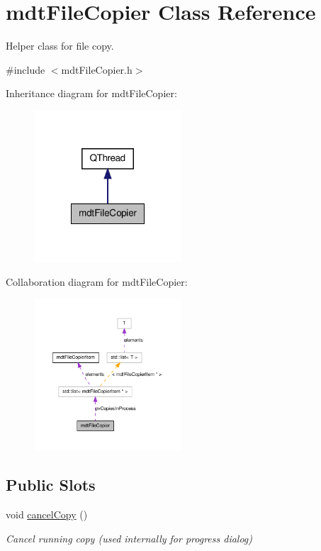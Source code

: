 \hypertarget{classmdt_file_copier}{\section{mdt\-File\-Copier Class Reference}
\label{classmdt_file_copier}
}


Helper class for file copy.  




{\ttfamily \#include $<$mdt\-File\-Copier.\-h$>$}



Inheritance diagram for mdt\-File\-Copier\-:\nopagebreak
\begin{figure}[H]
\begin{center}
\leavevmode
\includegraphics[width=156pt]{classmdt_file_copier__inherit__graph}
\end{center}
\end{figure}


Collaboration diagram for mdt\-File\-Copier\-:\nopagebreak
\begin{figure}[H]
\begin{center}
\leavevmode
\includegraphics[width=156pt]{classmdt_file_copier__coll__graph}
\end{center}
\end{figure}
\subsection*{Public Slots}
\begin{DoxyCompactItemize}
\item 
void \hyperlink{classmdt_file_copier_ab9a0a4121a3fa0c70652413ad7917714}{cancel\-Copy} ()
\begin{DoxyCompactList}\small\item\em Cancel running copy (used internally for progress dialog) \end{DoxyCompactList}\end{DoxyCompactItemize}
